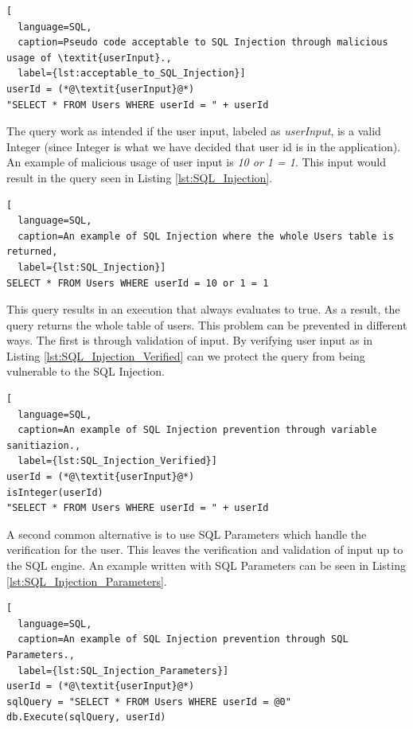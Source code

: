 \hfill
\begin{lstlisting}[
  language=SQL,
  caption=Pseudo code acceptable to SQL Injection through malicious usage of \textit{userInput}.,
  label={lst:acceptable_to_SQL_Injection}]
userId = (*@\textit{userInput}@*)
"SELECT * FROM Users WHERE userId = " + userId
\end{lstlisting}
\hfill

The query work as intended if the user input, labeled as \textit{userInput}, is a valid Integer (since Integer is what we have decided that user id is in the application). An example of malicious usage of user input is \textit{10 or 1 = 1}. This input would result in the query seen in Listing \ref{lst:SQL_Injection}.

\hfill
\begin{lstlisting}[
  language=SQL,
  caption=An example of SQL Injection where the whole Users table is returned,
  label={lst:SQL_Injection}]
SELECT * FROM Users WHERE userId = 10 or 1 = 1
\end{lstlisting}
\hfill

This query results in an execution that always evaluates to true. As a result, the query returns the whole table of users. This problem can be prevented in different ways. The first is through validation of input. By verifying user input as in Listing \ref{lst:SQL_Injection_Verified} can we protect the query from being vulnerable to the SQL Injection.

\hfill
\begin{lstlisting}[
  language=SQL,
  caption=An example of SQL Injection prevention through variable sanitiazion.,
  label={lst:SQL_Injection_Verified}]
userId = (*@\textit{userInput}@*)
isInteger(userId)
"SELECT * FROM Users WHERE userId = " + userId
\end{lstlisting}
\hfill

A second common alternative is to use SQL Parameters which handle the verification for the user. This leaves the verification and validation of input up to the SQL engine. An example written with SQL Parameters can be seen in Listing \ref{lst:SQL_Injection_Parameters}.

\hfill
\begin{lstlisting}[
  language=SQL,
  caption=An example of SQL Injection prevention through SQL Parameters.,
  label={lst:SQL_Injection_Parameters}]
userId = (*@\textit{userInput}@*)
sqlQuery = "SELECT * FROM Users WHERE userId = @0"
db.Execute(sqlQuery, userId)
\end{lstlisting}



